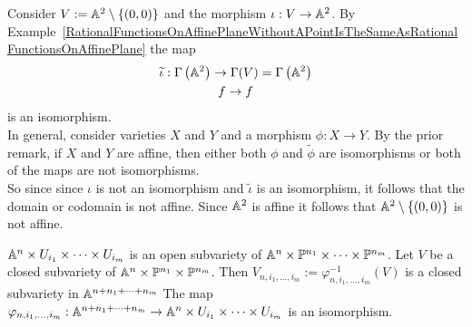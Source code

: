     \begin{example}\label{NonExampleOfAffineVariety}
        Consider $V:=\mathbb{A}^2\setminus\{(0,0)\}$ and the morphism $\iota: V\rightarrow \mathbb{A}^2$. By Example~\ref{RationalFunctionsOnAffinePlaneWithoutAPointIsTheSameAsRationalFunctionsOnAffinePlane} the map 
        \begin{gather*}
            \widetilde{\iota}: \Gamma\left(\mathbb{A}^2\right) \rightarrow \Gamma(V)=\Gamma\left(\mathbb{A}^2\right)\\
            f \rightarrow f
        \end{gather*}
        is an isomorphism.\\ 
        In general, consider varieties $X$ and $Y$ and a morphism $\phi: X\rightarrow Y$. By the prior remark, if $X$ and $Y$ are affine, then either both $\phi$ and $\widetilde{\phi}$ are isomorphisms or both of the maps are not isomorphisms.\\
        So since since $\iota$ is not an isomorphism and $\widetilde{\iota}$ is an isomorphism, it follows that the domain or codomain is not affine. Since $\mathbb{A}^2$ is affine it follows that $\mathbb{A}^2\setminus \{(0,0)\}$ is not affine.    
     \end{example}
    \begin{lemma}
        $\mathbb{A}^n\times U_{i_1}\times \cdots\times U_{i_m}$ is an open subvariety of $\mathbb{A}^n\times \mathbb{P}^{n_1}\times \cdots \times \mathbb{P}^{n_m}$. Let $V$ be a closed subvariety of $\mathbb{A}^n\times \mathbb{P}^{n_1}\times \mathbb{P}^{n_m}$. Then $V_{n,i_1,\dots,i_m} := \varphi_{n,i_1,\dots,i_m}^{-1}(V)$ is a closed subvariety in $\mathbb{A}^{n+n_1+\dots+n_m}$ The map $\varphi_{n,i_1,\dots,i_m} : \mathbb{A}^{n+n_1+\dots+n_m} \rightarrow \mathbb{A}^n\times U_{i_1}\times \cdots \times U_{i_m}$ is an isomorphism. 
    \end{lemma}

